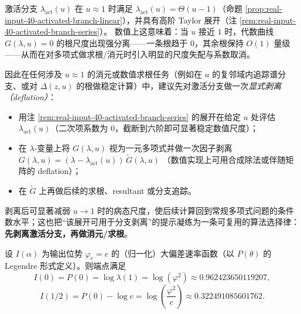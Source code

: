 \begin{remark}\label{rem:real-input-40-deflate-activated-branch}
激活分支 \(\lambda_{\mathrm{act}}(u)\) 在 \(u\approx 1\) 时满足 \(\lambda_{\mathrm{act}}(u)=\Theta(u-1)\)（命题 \ref{prop:real-input-40-activated-branch-linear}），并具有高阶 Taylor 展开（注 \ref{rem:real-input-40-activated-branch-series}）。
数值上这意味着：当 \(u\) 接近 \(1\) 时，代数曲线 \(G(\lambda,u)=0\) 的根尺度出现强分离——一条根趋于 \(0\)，其余根保持 \(O(1)\) 量级——从而在对多项式做求根/消元时引入明显的尺度失配与系数取消。
\par
\noindent 因此在任何涉及 \(u\approx 1\) 的消元或数值求根任务（例如在 \(u\) 的复邻域内追踪谱分支、或对 \(\Delta(z,u)\) 的根做稳定计算）中，建议先对激活分支做一次\emph{显式剥离（deflation）}：
\begin{itemize}
  \item 用注 \ref{rem:real-input-40-activated-branch-series} 的展开在给定 \(u\) 处评估 \(\lambda_{\mathrm{act}}(u)\)（二次项系数为 \(0\)，截断到六阶即可显著稳定数值尺度）；
  \item 在 \(\lambda\)-变量上将 \(G(\lambda,u)\) 视为一元多项式并做一次因子剥离
  \(
  G(\lambda,u)=(\lambda-\lambda_{\mathrm{act}}(u))\,\widetilde G(\lambda,u)
  \)
  （数值实现上可用合成除法或伴随矩阵的 deflation）；
  \item 在 \(\widetilde G\) 上再做后续的求根、resultant 或分支追踪。
\end{itemize}
剥离后可显著减弱 \(u\to 1\) 时的病态尺度，使后续计算回到常规多项式问题的条件数水平；这也把“该展开可用于分支剥离”的提示凝练为一条可复用的算法选择律：\textbf{先剥离激活分支，再做消元/求根}。
\end{remark}

\begin{corollary}[端点大偏差代价]\label{cor:real-input-40-rate-endpoints}
设 $I(\alpha)$ 为输出位势 $\varphi_e=e$ 的（归一化）大偏差速率函数（以 $P(\theta)$ 的 Legendre 形式定义）。则端点满足
\[
I(0)=P(0)=\log\lambda(1)=\log(\varphi^2)\approx 0.962423650119207,
\]
\[
I(1/2)=P(0)-\log c=\log\!\left(\frac{\varphi^2}{c}\right)\approx 0.322491085601762.
\]
\end{corollary}



